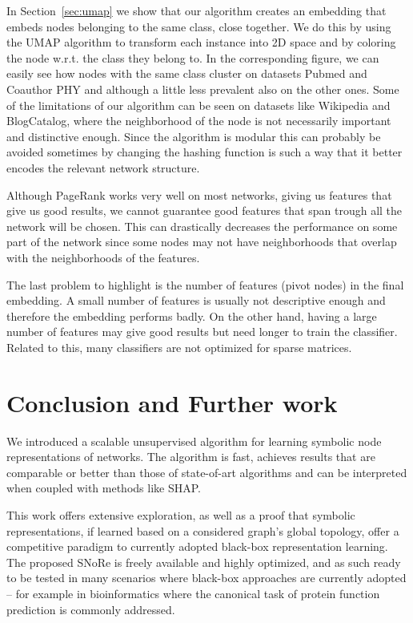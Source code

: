\documentclass[twoside,11pt]{article}
\begin{document}
In Section~\ref{sec:umap} we show that our algorithm creates an embedding that embeds nodes belonging to the same class, close together. We do this by using the UMAP algorithm to transform each instance into 2D space and by coloring the node w.r.t. the class they belong to. In the corresponding figure, we can easily see how nodes with the same class cluster on datasets Pubmed and Coauthor PHY and although a little less prevalent also on the other ones.    
Some of the limitations of our algorithm can be seen on datasets like Wikipedia and BlogCatalog, where the neighborhood of the node is not necessarily important and distinctive enough. Since the algorithm is modular this can probably be avoided sometimes by changing the hashing function is such a way that it better encodes the relevant network structure.

Although PageRank works very well on most networks, giving us features that give us good results, we cannot guarantee good features that span trough all the network will be chosen. This can drastically decreases the performance on some part of the network since some nodes may not have neighborhoods that overlap with the neighborhoods of the features.  

The last problem to highlight is the number of features (pivot nodes) in the final embedding. A small number of features is usually not descriptive enough and therefore the embedding performs badly. On the other hand, having a large number of features may give good results but need longer to train the classifier. Related to this, many classifiers are not optimized for sparse matrices.

\section{Conclusion and Further work}
\label{sec:conclusions}
We introduced a scalable unsupervised algorithm for learning symbolic node representations of networks. The algorithm is fast, achieves results that are comparable or better than those of state-of-art algorithms and can be interpreted when coupled with methods like SHAP.

This work offers extensive exploration, as well as a proof that symbolic representations, if learned based on a considered graph's global topology, offer a competitive paradigm to currently adopted black-box representation learning. The proposed SNoRe is freely available and highly optimized, and as such ready to be tested in many scenarios where black-box approaches are currently adopted -- for example in bioinformatics where the canonical task of protein function prediction is commonly addressed.
\end{document}
